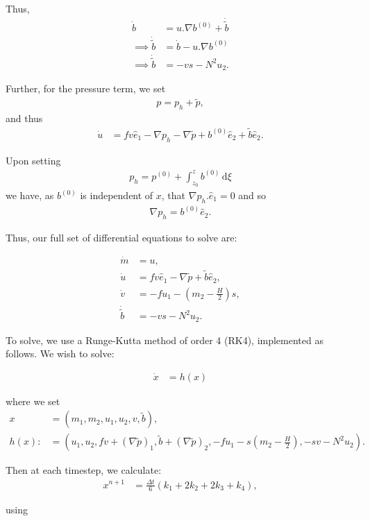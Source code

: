 \documentclass[11pt, oneside]{article}   	%
\newcommand{\eone}{\hat{e}_1}
\newcommand{\etwo}{\hat{e}_2}
\newcommand{\bt}{\tilde{b}}
\newcommand{\pt}{\tilde{p}}
\newcommand{\dt}{\Delta t}
\begin{document}
Thus,
\begin{align} 
\dot{b} &= u.\nabla b^{(0)} + \dot{\bt} \\
\implies \dot{\bt} &= \dot{b} - u.\nabla b^{(0)} \\
\implies \dot{\bt} &= -vs - N^2 u_2.
\end{align}

Further, for the pressure term, we set
\begin{align} 
p =  p_h + \pt,
\end{align}
and thus
\begin{align} 
\dot{u} &= f v \eone - \nabla p_h - \nabla \pt + b^{(0)} \etwo + \bt \etwo.
\end{align}

Upon setting
\begin{align} 
p_h = p^{(0)} + \int_{z_0}^z b^{(0)}\,\mathrm{d}\xi
\end{align}
we have, as \(b^{(0)}\) is independent of \(x\), that \(\nabla p_h . \eone = 0\) and so
\begin{align} 
\nabla p_h = b^{(0)} \etwo.
\end{align}

Thus, our full set of differential equations to solve are:

\begin{align} 
\dot{m} &= u, \\
\dot{u} &= f v \eone - \nabla \pt + \bt \etwo, \\
\dot{v} &= -f u_1 - (m_2 - \frac{H}{2}) s, \\
\dot{\bt} &= -v s - N^2 u_2.
\end{align}

To solve, we use a Runge-Kutta method of order 4 (RK4), implemented as follows. We wish to solve:

\begin{align} 
\dot{x} &= h(x)
\end{align}

where we set
\begin{align} 
x &= (m_1, m_2, u_1, u_2, v, \bt), \\
h(x) :&= (u_1, u_2, fv + (\nabla \pt)_1, \bt + (\nabla \pt)_2, -fu_1 -s(m_2 - \frac{H}{2}), -sv -N^2u_2).
\end{align}

Then at each timestep, we calculate:
\begin{align} 
x^{n+1} &= \frac{\dt}{6}(k_1 + 2k_2 + 2k_3 + k_4),
\end{align}

using
\end{document}
